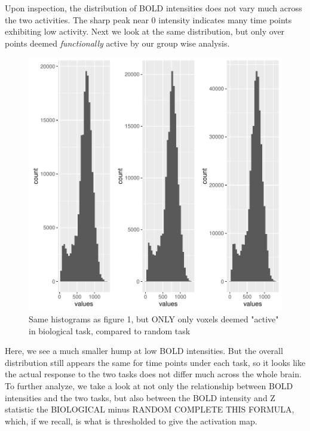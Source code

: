 \documentclass{report}
\begin{document}
Upon inspection, the distribution of BOLD intensities does not vary much across the two activities. The sharp peak near 0 intensity indicates many time points exhibiting low activity. Next we look at the same distribution, but only over points deemed \textit{functionally} active by our group wise analysis.  

\begin{figure}
\caption{Same histograms as figure 1, but ONLY only voxels deemed "active" in biological task, compared to random task}
\includegraphics{Milestone-003}
\end{figure}

Here, we see a much smaller hump at low BOLD intensities. But the overall distribution still appears the same for time points under each task, so it looks like the actual response to the two tasks does not differ much across the whole brain. To further analyze, we take a look at not only the relationship between BOLD intensities and the two tasks, but also between the BOLD intensity and Z statistic  the BIOLOGICAL minus RANDOM COMPLETE THIS FORMULA, which, if we recall, is what is thresholded to give the activation map. 
\end{document}
